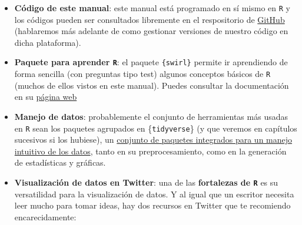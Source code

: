 \documentclass[11pt,]{book}
\begin{document}
\begin{itemize}
\item
  \textbf{Código de este manual}: este manual está programado en sí mismo en \texttt{R} y los códigos pueden ser consultados libremente en el respositorio de \href{https://github.com/dadosdelaplace/docencia}{GitHub} (hablaremos más adelante de como gestionar versiones de nuestro código en dicha plataforma).
\item
  \textbf{Paquete para aprender \texttt{R}}: el paquete \texttt{\{swirl\}} permite ir aprendiendo de forma sencilla (con preguntas tipo test) algunos conceptos básicos de \texttt{R} (muchos de ellos vistos en este manual). Puedes consultar la documentación en su \href{https://swirlstats.com/}{página web}
\item
  \textbf{Manejo de datos}: probablemente el conjunto de herramientas más usadas en \texttt{R} sean los paquetes agrupados en \{\texttt{tidyverse}\} (y que veremos en capítulos sucesivos si los hubiese), un \href{https://www.tidyverse.org/}{conjunto de paquetes integrados para un manejo intuitivo de los datos}, tanto en su preprocesamiento, como en la generación de estadísticas y gráficas.
\item
  \textbf{Visualización de datos en Twitter}: una de las \textbf{fortalezas de \texttt{R}} es su versatilidad para la visualización de datos. Y al igual que un escritor necesita leer mucho para tomar ideas, hay dos recursos en Twitter que te recomiendo encarecidamente:


\end{itemize}
\end{document}
